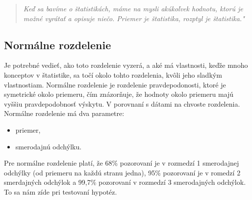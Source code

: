 \begin{quote}
\emph{Keď sa bavíme o štatistikách, máme na mysli akúkoľvek hodnotu,
ktorú je možné vyrátať a opisuje niečo. Priemer je štatistika, rozptyl
je štatistika."}
\end{quote}

\hypertarget{normuxe1lne-rozdelenie}{%
\subsection{Normálne rozdelenie}\label{normuxe1lne-rozdelenie}}

Je potrebné vedieť, ako toto rozdelenie vyzerá, a aké má vlastnosti,
keďže mnoho konceptov v štatistike, sa točí okolo tohto rozdelenia,
kvôli jeho sladkým vlastnostiam. Normálne rozdelenie je rozdelenie
pravdepodonosti, ktoré je symetrické okolo priemeru, čím znázorňuje, že
hodnoty okolo priemeru majú vyššiu pravdepodobnosť výskytu. V porovnaní
s dátami na chvoste rozdelenia. Normálne rozdelenie má dva parametre:

\begin{itemize}
\tightlist
\item
  priemer,
\item
  smerodajnú odchýlku.
\end{itemize}

Pre normálne rozdelenie platí, že 68\% pozorovaní je v rozmedzí 1
smerodajnej odchýlky (od priemeru na každú stranu jedna), 95\%
pozorovaní je v romedzí 2 smerdajných odchýlok a 99,7\% pozorovaní v
rozmedzí 3 smerodajných odchýlok. To sa nám zíde pri testovaní hypotéz.


